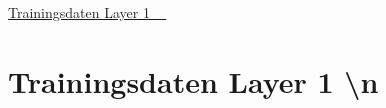 \hyperlink{Trainingsdaten_Layer_1}{Trainingsdaten Layer 1 ~\newline
} ~\newline
\hypertarget{Trainingsdaten_Layer_1}{}\section{Trainingsdaten Layer 1 \textbackslash{}n}\label{Trainingsdaten_Layer_1}
 